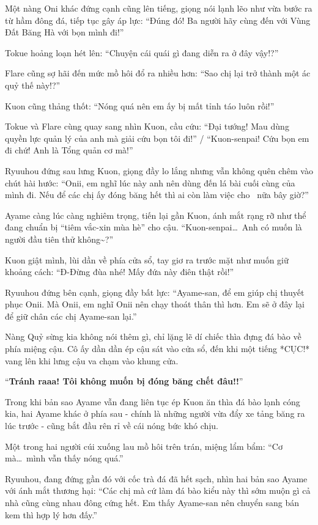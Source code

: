 \documentclass[../main.tex]{subfiles}
\begin{document}
Một nàng Oni khác đứng cạnh cũng lên tiếng, giọng nói lạnh lẽo như vừa bước ra từ hầm đông đá, tiếp tục gây áp lực: ``Đúng đó! Ba người hãy cùng đến với Vùng Đất Băng Hà với bọn mình đi!''

Tokue hoảng loạn hét lên: ``Chuyện cái quái gì đang diễn ra ở đây vậy!?''

Flare cũng sợ hãi đến mức mồ hôi đổ ra nhiều hơn: ``Sao chị lại trở thành một ác quỷ thế này!?''

Kuon cũng thảng thốt: ``Nóng quá nên em ấy bị mất tỉnh táo luôn rồi!''

Tokue và Flare cùng quay sang nhìn Kuon, cầu cứu: ``Đại tướng! Mau dùng quyền lực quản lý của anh mà giải cứu bọn tôi đi!'' / ``Kuon-senpai! Cứu bọn em đi chứ! Anh là Tổng quản cơ mà!''

Ryuuhou đứng sau lưng Kuon, giọng đầy lo lắng nhưng vẫn không quên chêm vào chút hài hước: ``Onii, em nghĩ lúc này anh nên dùng đến lá bài cuối cùng của mình đi. Nếu để các chị ấy đóng băng hết thì ai còn làm việc cho \hll\ nữa bây giờ?''

Ayame càng lúc càng nghiêm trọng, tiến lại gần Kuon, ánh mắt rạng rỡ như thể đang chuẩn bị ``tiêm vắc-xin mùa hè'' cho cậu. ``Kuon-senpai\dots\ Anh có muốn là người đầu tiên thử không\~{}?''

Kuon giật mình, lùi dần về phía cửa sổ, tay giơ ra trước mặt như muốn giữ khoảng cách: ``Đ-Đừng đùa nhé! Mấy đứa này điên thật rồi!''

Ryuuhou đứng bên cạnh, giọng đầy bất lực: ``Ayame-san, để em giúp chị thuyết phục Onii. Mà Onii, em nghĩ Onii nên chạy thoát thân thì hơn. Em sẽ ở đây lại để giữ chân các chị Ayame-san lại.''

Nàng Quỷ sừng kia không nói thêm gì, chỉ lặng lẽ dí chiếc thìa đựng đá bào về phía miệng cậu. Cô ấy dần dần ép cậu sát vào cửa sổ, đến khi một tiếng *CỤC!* vang lên khi lưng cậu va chạm vào khung cửa.

``\textbf{Tránh raaa! Tôi không muốn bị đóng băng chết đâu!!}''

Trong khi bản sao Ayame vẫn đang liên tục ép Kuon ăn thìa đá bào lạnh cóng kia, hai Ayame khác ở phía sau - chính là những người vừa đẩy xe tảng băng ra lúc trước - cũng bắt đầu rên rỉ về cái nóng bức khó chịu.

Một trong hai người cúi xuống lau mồ hôi trên trán, miệng lẩm bẩm: ``Cơ mà\dots\ mình vẫn thấy nóng quá.''

Ryuuhou, đang đứng gần đó với cốc trà đá đã hết sạch, nhìn hai bản sao Ayame với ánh mắt thương hại: ``Các chị mà cứ làm đá bào kiểu này thì sớm muộn gì cả nhà cũng cùng nhau đông cứng hết. Em thấy Ayame-san nên chuyển sang bán kem thì hợp lý hơn đấy.''
\end{document}
